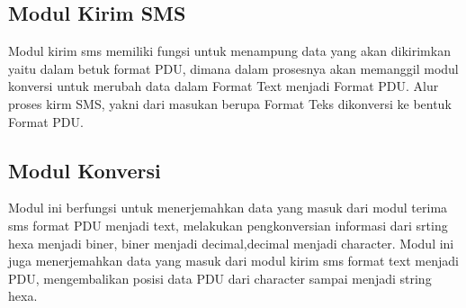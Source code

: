 \documentclass[12pt,a4paper]{article}
\begin{document}
\subsection{Modul Kirim SMS}
Modul kirim sms memiliki fungsi untuk menampung data yang akan dikirimkan yaitu dalam betuk format PDU, dimana dalam prosesnya akan memanggil modul konversi untuk merubah data dalam Format Text menjadi Format PDU. Alur proses kirm SMS, yakni dari masukan berupa Format Teks dikonversi ke bentuk Format PDU. 
\subsection{ Modul Konversi}
Modul ini berfungsi untuk menerjemahkan data yang masuk dari modul terima sms  format PDU menjadi  text,  melakukan pengkonversian informasi dari srting hexa menjadi biner, biner menjadi decimal,decimal menjadi character. Modul ini juga menerjemahkan data yang masuk  dari modul kirim sms format text menjadi PDU, mengembalikan posisi data PDU dari character sampai menjadi string hexa. 
\end{document}
